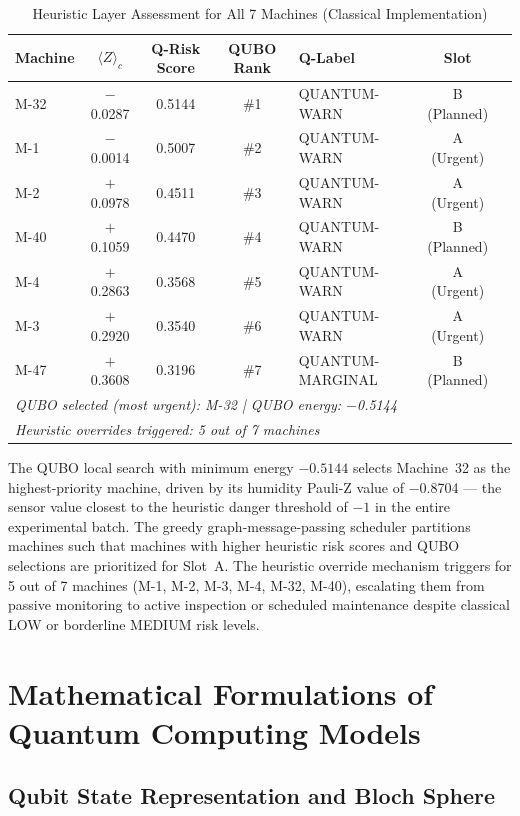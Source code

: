 \begin{table}[htbp]
\centering
\caption{Heuristic Layer Assessment for All 7 Machines (Classical Implementation)}
\label{tab:heuristic_layer}
\begin{tabular}{lccclcc}
\hline
\textbf{Machine} & \textbf{$\langle Z \rangle_c$} & \textbf{Q-Risk Score} & \textbf{QUBO Rank} & \textbf{Q-Label} & \textbf{Slot} \\
\hline
M-32 & $-$0.0287 & 0.5144 & \#1 & QUANTUM-WARN   & B (Planned) \\
M-1  & $-$0.0014 & 0.5007 & \#2 & QUANTUM-WARN   & A (Urgent) \\
M-2  & $+$0.0978 & 0.4511 & \#3 & QUANTUM-WARN   & A (Urgent) \\
M-40 & $+$0.1059 & 0.4470 & \#4 & QUANTUM-WARN   & B (Planned) \\
M-4  & $+$0.2863 & 0.3568 & \#5 & QUANTUM-WARN   & A (Urgent) \\
M-3  & $+$0.2920 & 0.3540 & \#6 & QUANTUM-WARN   & A (Urgent) \\
M-47 & $+$0.3608 & 0.3196 & \#7 & QUANTUM-MARGINAL & B (Planned) \\
\hline
\multicolumn{5}{l}{\textit{QUBO selected (most urgent): M-32 | QUBO energy: $-$0.5144}} \\
\multicolumn{5}{l}{\textit{Heuristic overrides triggered: 5 out of 7 machines}} \\
\hline
\end{tabular}
\end{table}

The QUBO local search with minimum energy $-0.5144$ selects Machine~32 as the highest-priority machine, driven by its humidity Pauli-Z value of $-$0.8704 --- the sensor value closest to the heuristic danger threshold of $-1$ in the entire experimental batch. The greedy graph-message-passing scheduler partitions machines such that machines with higher heuristic risk scores and QUBO selections are prioritized for Slot~A. The heuristic override mechanism triggers for 5 out of 7 machines (M-1, M-2, M-3, M-4, M-32, M-40), escalating them from passive monitoring to active inspection or scheduled maintenance despite classical LOW or borderline MEDIUM risk levels.


\section{Mathematical Formulations of Quantum Computing Models}

\subsection{Qubit State Representation and Bloch Sphere}

